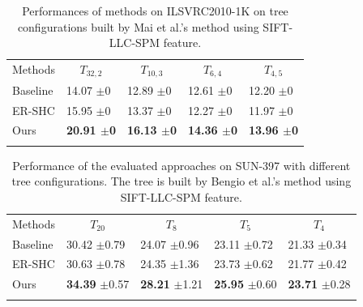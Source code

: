 \documentclass[review]{elsarticle}
\begin{document}
\begin{table}
\caption{Performances of methods on ILSVRC2010-1K on tree configurations built by Mai et al.'s method \cite{MaiICIAP15} using SIFT-LLC-SPM feature.}  
\label{tbl:ImageNet1KSIFT.ICIAP} 
\centering
\label{tbl:ImageNet1K} 

\begin{tabular}{lllll}
\hline\noalign{\smallskip}
Methods  & \multicolumn{1}{c}{$T_{32,2}$} & \multicolumn{1}{c}{$T_{10,3}$} & \multicolumn{1}{c}{$T_{6,4}$} &		\multicolumn{1}{c}{$T_{4,5}$} \\
\noalign{\smallskip}\hline\hline\noalign{\smallskip}

Baseline \cite{MaiICIAP15} 	 & 14.07 $\pm$0  & 12.89 $\pm$0  & 12.61 $\pm$0 & 12.20 $\pm$0 \\
ER-SHC \cite{Zhu.CVIU2014}   & 15.95 $\pm$0  & 13.37 $\pm$0  & 12.27 $\pm$0 & 11.97 $\pm$0\\
Ours	     &  \textbf{20.91 $\pm$0} & \textbf{16.13 $\pm$0} & \textbf{14.36 $\pm$0} & \textbf{13.96 $\pm$0} \\

\noalign{\smallskip}\hline\noalign{\smallskip}
\end{tabular}
\end{table}

\begin{table}
\caption{Performance of the evaluated approaches on SUN-397 with different tree configurations. The tree is built by Bengio et al.'s method \cite{Bengio.NIPS2010} using SIFT-LLC-SPM feature.}  
\label{tbl:SUN397SIFT}
\centering
\begin{tabular}{lllll}
\hline\noalign{\smallskip}
Methods  & \multicolumn{1}{c}{$T_{20}$} & \multicolumn{1}{c}{$T_{8}$} & \multicolumn{1}{c}{$T_{5}$} &		\multicolumn{1}{c}{$T_{4}$} \\
\noalign{\smallskip}\hline\hline\noalign{\smallskip}
Baseline 	 				& 30.42 $\pm$0.79 & 24.07 $\pm$0.96 & 23.11 $\pm$0.72 & 21.33 $\pm$0.34 \\
ER-SHC \cite{Zhu.CVIU2014} 	& 30.63 $\pm$0.78 & 24.35 $\pm$1.36 & 23.73 $\pm$0.62 & 21.77 $\pm$0.42 \\

Ours             &  \textbf{34.39} $\pm$0.57 & \textbf{28.21} $\pm$1.21 & \textbf{25.95} $\pm$0.60 & \textbf{23.71} $\pm$0.28 \\
\noalign{\smallskip}\hline\noalign{\smallskip}
\end{tabular}
\end{table}
\end{document}
